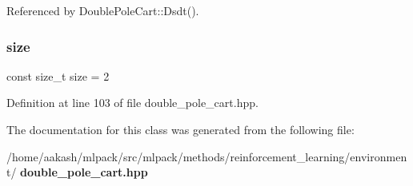 Referenced by Double\+Pole\+Cart\+::\+Dsdt().

\mbox{\label{classmlpack_1_1rl_1_1DoublePoleCart_1_1Action_a685609860d73ccd0d45ada287ab9ab5f}} 
\subsubsection{size}
{\footnotesize\ttfamily const size\+\_\+t size = 2\hspace{0.3cm}{\ttfamily [static]}}



Definition at line 103 of file double\+\_\+pole\+\_\+cart.\+hpp.



The documentation for this class was generated from the following file\+:\begin{DoxyCompactItemize}
\item 
/home/aakash/mlpack/src/mlpack/methods/reinforcement\+\_\+learning/environment/\textbf{ double\+\_\+pole\+\_\+cart.\+hpp}\end{DoxyCompactItemize}
